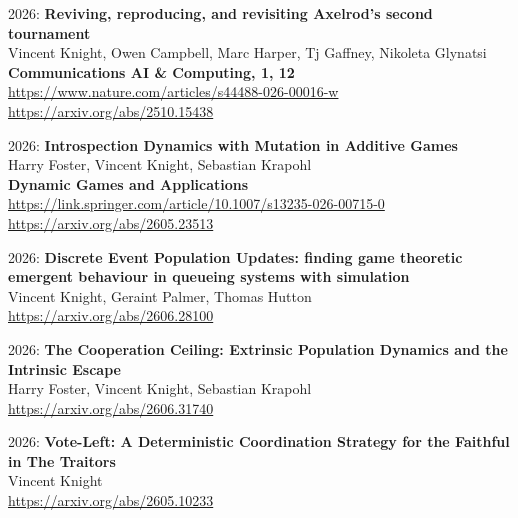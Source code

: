 \documentclass[10pt]{article}
\begin{document}
\begin{etaremune}

\item
  2026: \textbf{Reviving, reproducing, and revisiting Axelrod's second tournament}\\
  Vincent Knight, Owen Campbell, Marc Harper, Tj Gaffney, Nikoleta Glynatsi\\
  \textbf{Communications AI \& Computing, 1, 12}\\
  \url{https://www.nature.com/articles/s44488-026-00016-w}\\
  \url{https://arxiv.org/abs/2510.15438}\\

\item
  2026: \textbf{Introspection Dynamics with Mutation in Additive Games}\\
  Harry Foster, Vincent Knight, Sebastian Krapohl\\
  \textbf{Dynamic Games and Applications}\\
  \url{https://link.springer.com/article/10.1007/s13235-026-00715-0}\\
  \url{https://arxiv.org/abs/2605.23513}\\

\item
  2026: \textbf{Discrete Event Population Updates: finding game theoretic emergent behaviour in queueing systems with simulation}\\
  Vincent Knight, Geraint Palmer, Thomas Hutton\\
  
  
  \url{https://arxiv.org/abs/2606.28100}\\

\item
  2026: \textbf{The Cooperation Ceiling: Extrinsic Population Dynamics and the Intrinsic Escape}\\
  Harry Foster, Vincent Knight, Sebastian Krapohl\\
  
  
  \url{https://arxiv.org/abs/2606.31740}\\

\item
  2026: \textbf{Vote-Left: A Deterministic Coordination Strategy for the Faithful in The Traitors}\\
  Vincent Knight\\
  
  
  \url{https://arxiv.org/abs/2605.10233}\\


\end{etaremune}
\end{document}
